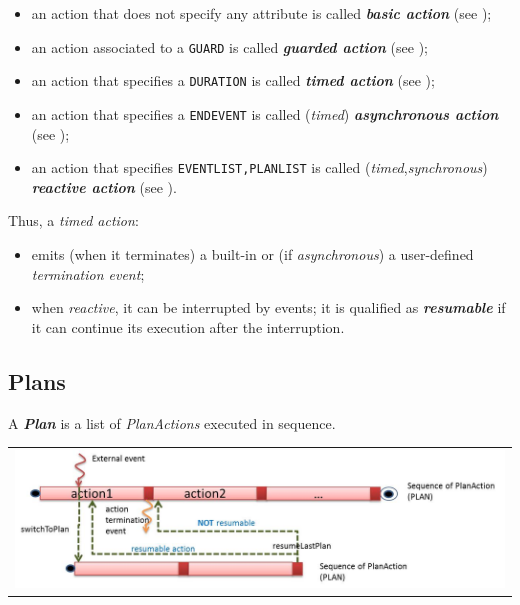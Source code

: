 \begin{itemize}
\item an action that does not specify any attribute is  called \textit{\textbf{basic action}} (see );
\item an action associated to a \texttt{GUARD} is  called \textit{\textbf{guarded action}} (see );
\item an action that specifies a \texttt{DURATION} is called \textit{\textbf{timed action}} (see );
\item an action that specifies a \texttt{ENDEVENT} is called (\textit{timed}) \textit{\textbf{asynchronous action}} (see );
\item an action that specifies \texttt{EVENTLIST,PLANLIST} is called (\textit{timed},\textit{synchronous}) \textit{\textbf{reactive action}} (see ).
\end{itemize}

Thus, a \textit{timed action}: 
\begin{itemize}
\item emits (when it terminates) a built-in or (if \textit{asynchronous})  a user-defined \textit{termination event};
\item when \textit{reactive}, it can be interrupted by events; it is qualified as \textbf{\textit{resumable}} if it can continue its execution after the interruption.
\end{itemize}

\subsection{Plans}
A \textbf{\textit{Plan}} is a list of \textit{PlanActions} executed in sequence.

\begin{center}
\begin{tabular}{ c }
     \includegraphics[scale = 0.45]{img/actionEvents.jpg}\\
\end{tabular}{   }
\end{center}

